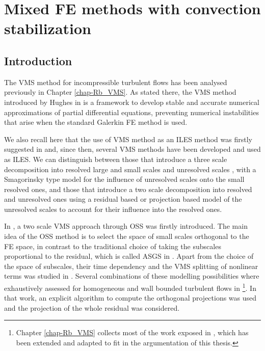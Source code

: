 \chapter{Mixed FE methods with convection stabilization}
\label{chap-TBT_OSS}

\section{Introduction}
\label{sec-C5_introduction}

The VMS method for incompressible turbulent flows has been analysed previously in Chapter \ref{chap-Rb_VMS}. As stated there, the VMS method introduced by Hughes in \cite{hughes_multiscale_1995,hughes_variational_1998} is a framework to develop stable and accurate numerical approximations of partial differential equations, preventing numerical instabilities that arise when the standard Galerkin FE method is used. 

We also recall here that the use of VMS method as an ILES method was firstly suggested in \cite{hughes_multiscale_2001,hughes_large_2001,codina_stabilized_2002} and, since then, several VMS methods have been developed and used as ILES. We can distinguish between those that introduce a three scale decomposition into resolved large and small scales and unresolved scales \cite{koobus_variational_2004,john_variants_2008, john_numerical_2010, masud_variational_2011}, with a Smagorinsky type model for the influence of unresolved scales onto the small resolved ones, and those that introduce a two scale decomposition into resolved and unresolved ones \cite{bazilevs_variational_2007,colomes_assessment_2015} using a residual based or projection based model of the unresolved scales to account for their influence into the resolved ones.

In \cite{codina_stabilization_2000}, a two scale VMS approach through OSS was firstly introduced. The main idea of the OSS method is to select the space of small scales orthogonal to the FE space, in contrast to the traditional choice of taking the subscales proportional to the residual, which is called ASGS in \cite{codina_stabilization_2000}. Apart from the choice of the space of subscales, their time dependency and the VMS splitting of nonlinear terms was studied in \cite{codina_time_2007}. Several combinations of these modelling possibilities where exhaustively assessed for homogeneous and wall bounded turbulent flows in \cite{colomes_assessment_2015}\footnote{Chapter \ref{chap-Rb_VMS} collects most of the work exposed in \cite{colomes_assessment_2015}, which has been extended and adapted to fit in the argumentation of this thesis.}. In that work, an explicit algorithm to compute the orthogonal projections was used and the projection of the whole residual was considered.

